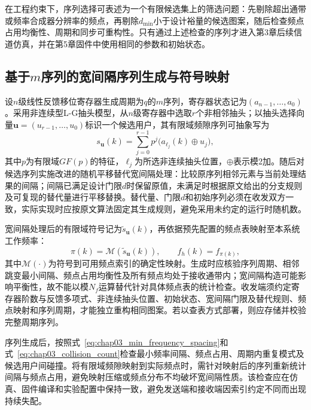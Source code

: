 在工程约束下，序列选择可表述为一个有限候选集上的筛选问题：先剔除超出通带或频率合成器分辨率的频点，再剔除$d_{\min}$小于设计裕量的候选图案，随后检查频点占用均衡性、周期和同步可重构性。只有通过上述检查的序列才进入第3章后续信道仿真，并在第5章固件中使用相同的参数和初始状态。

\subsection{基于$m$序列的宽间隔序列生成与符号映射}

设$n$级线性反馈移位寄存器生成周期为$q$的$m$序列，寄存器状态记为$(a_{n-1},\ldots,a_0)$。采用非连续型L-G抽头模型，从$n$级寄存器中选取$r$个非相邻抽头；以抽头选择向量$\boldsymbol{u}=(u_{r-1},\ldots,u_0)$标识一个候选用户，其有限域频隙序列可抽象写为
\begin{equation}
 s_{\boldsymbol{u}}(k)=\sum_{j=0}^{r-1}p^j\bigl(a_{\ell_j}(k)\oplus u_j\bigr),
\label{eq:chap03_prn_hopping}
\end{equation}
其中$p$为有限域$GF(p)$的特征，$\ell_j$为所选非连续抽头位置，$\oplus$表示模2加。随后对候选序列实施改进的随机平移替代宽间隔处理：比较原序列相邻元素与当前处理结果的间隔；间隔已满足设计门限$d$时保留原值，未满足时根据原文给出的分支规则及可复现的替代量进行平移替换\cite{FengJianLiYiLeiGaiJinDeSuiJiPingYiTiDaiFaGouZaoDeKuanJianGeTiaoPinXuLie2013}。替代量、门限$d$和初始序列必须在收发双方一致，实际实现时应按原文算法固定其生成规则，避免采用未约定的运行时随机数。

宽间隔处理后的有限域符号记为$\tilde{s}_{\boldsymbol{u}}(k)$，再依据预先配置的频点表映射至本系统工作频率：
\begin{equation}
 \pi(k)=\mathcal{M}\!\left(\tilde{s}_{\boldsymbol{u}}(k)\right),\qquad
 f_h(k)=f_{\pi(k)} ,
\end{equation}
其中$\mathcal{M}(\cdot)$为符号到可用频点索引的确定性映射。生成时应核验序列周期、相邻跳变最小间隔、频点占用均衡性及所有频点均处于接收通带内；宽间隔构造可能影响平衡性，故不能以模$N_f$运算替代针对具体频点表的统计检查。收发端须约定寄存器阶数与反馈多项式、非连续抽头位置、初始状态、宽间隔门限及替代规则、频点映射和序列周期，才能独立重构相同图案。若以查表方式部署，则应存储并校验完整周期序列。

序列生成后，按照式~\eqref{eq:chap03_min_frequency_spacing}和式~\eqref{eq:chap03_collision_count}检查最小频率间隔、频点占用、周期内重复模式及候选用户间碰撞。将有限域频隙映射到实际频点时，需针对映射后的序列重新统计间隔与频点占用，避免映射压缩或频点分布不均破坏宽间隔性质。该检查应在仿真、固件编译和实验配置中保持一致，避免发送端和接收端因索引约定不同而出现持续失配。

